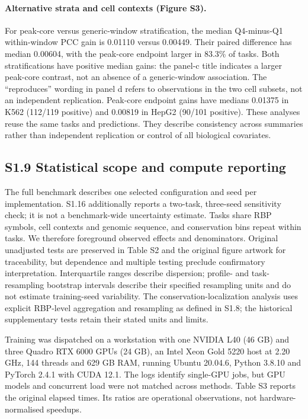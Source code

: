 \documentclass[11pt]{article}
\begin{document}
\paragraph{Alternative strata and cell contexts (Figure S3).} For peak-core versus generic-window stratification, the median Q4-minus-Q1 within-window PCC gain is 0.01110 versus 0.00449. Their paired difference has median 0.00604, with the peak-core endpoint larger in 83.3\% of tasks. Both stratifications have positive median gains: the panel-c title indicates a larger peak-core contrast, not an absence of a generic-window association. The ``reproduces'' wording in panel d refers to observations in the two cell subsets, not an independent replication. Peak-core endpoint gains have medians 0.01375 in K562 (112/119 positive) and 0.00819 in HepG2 (90/101 positive). These analyses reuse the same tasks and predictions. They describe consistency across summaries rather than independent replication or control of all biological covariates.

\subsection*{S1.9 Statistical scope and compute reporting}

The full benchmark describes one selected configuration and seed per implementation. S1.16 additionally reports a two-task, three-seed sensitivity check; it is not a benchmark-wide uncertainty estimate. Tasks share RBP symbols, cell contexts and genomic sequence, and conservation bins repeat within tasks. We therefore foreground observed effects and denominators. Original unadjusted tests are preserved in Table S2 and the original figure artwork for traceability, but dependence and multiple testing preclude confirmatory interpretation. Interquartile ranges describe dispersion; profile- and task-resampling bootstrap intervals describe their specified resampling units and do not estimate training-seed variability. The conservation-localization analysis uses explicit RBP-level aggregation and resampling as defined in S1.8; the historical supplementary tests retain their stated units and limits.

Training was dispatched on a workstation with one NVIDIA L40 (46 GB) and three Quadro RTX 6000 GPUs (24 GB), an Intel Xeon Gold 5220 host at 2.20 GHz, 144 threads and 629 GB RAM, running Ubuntu 20.04.6, Python 3.8.10 and PyTorch 2.4.1 with CUDA 12.1. The logs identify single-GPU jobs, but GPU models and concurrent load were not matched across methods. Table S3 reports the original elapsed times. Its ratios are operational observations, not hardware-normalised speedups.
\end{document}
